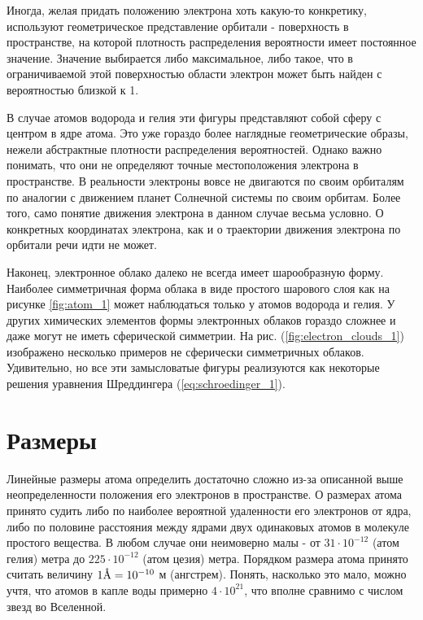 Иногда, желая придать положению электрона хоть какую-то конкретику, используют геометрическое представление орбитали - поверхность в пространстве, на которой плотность распределения вероятности имеет постоянное значение.
Значение выбирается либо максимальное, либо такое, что в ограничиваемой этой поверхностью области электрон может быть найден с вероятностью близкой к 1.

В случае атомов водорода и гелия эти фигуры представляют собой сферу с центром в ядре атома.
Это уже гораздо более наглядные геометрические образы, нежели абстрактные плотности распределения вероятностей.
Однако важно понимать, что они не определяют точные местоположения электрона в пространстве. 
В реальности электроны вовсе не двигаются по своим орбиталям по аналогии с движением планет Солнечной системы по своим орбитам.
Более того, само понятие движения электрона в данном случае весьма условно.
О конкретных координатах электрона, как и о траектории движения электрона по орбитали речи идти не может.

Наконец, электронное облако далеко не всегда имеет шарообразную форму.
Наиболее симметричная форма облака в виде простого шарового слоя как на рисунке \ref{fig:atom_1} может наблюдаться только у атомов водорода и гелия.
У других химических элементов формы электронных облаков гораздо сложнее и даже могут не иметь сферической симметрии.
На рис. (\ref{fig:electron_clouds_1}) изображено несколько примеров не сферически симметричных облаков.
Удивительно, но все эти замысловатые фигуры реализуются как некоторые решения уравнения Шреддингера (\ref{eq:schroedinger_1}).


\section*{Размеры}

Линейные размеры атома определить достаточно сложно из-за описанной выше неопределенности положения его электронов в пространстве.
О размерах атома принято судить либо по наиболее вероятной удаленности его электронов от ядра, либо по половине расстояния между ядрами двух одинаковых атомов в молекуле простого вещества.
В любом случае они неимоверно малы - от $31\cdot 10^{-12}$ (атом гелия) метра до $225\cdot 10^{-12}$ (атом цезия) метра.
Порядком размера атома принято считать величину $1\mbox{\normalfont\AA} = 10^{-10}$ м (ангстрем).
Понять, насколько это мало, можно учтя, что атомов в капле воды примерно $4\cdot 10^{21}$, что вполне сравнимо с числом звезд во Вселенной.


